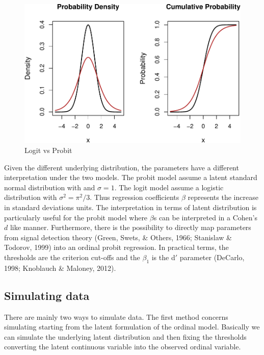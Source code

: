 \documentclass[
  man,floatsintext]{apa6}
\begin{document}
\begin{figure}

{\centering \includegraphics{paper-new_files/figure-latex/logit-vs-probit-1} 

}

\caption{Logit vs Probit}\label{fig:logit-vs-probit}
\end{figure}

Given the different underlying distribution, the parameters have a different interpretation under the two models. The probit model assume a latent standard normal distribution with and \(\sigma = 1\). The logit model assume a logistic distribution with \(\sigma^2 = \pi^2/3\). Thus regression coefficients \(\beta\) represents the increase in standard deviations units. The interpretation in terms of latent distribution is particularly useful for the probit model where \(\beta\)s can be interpreted in a Cohen's \(d\) like manner. Furthermore, there is the possibility to directly map parameters from signal detection theory (Green, Swets, \& Others, 1966; Stanislaw \& Todorov, 1999) into an ordinal probit regression. In practical terms, the thresholds are the criterion cut-offs and the \(\beta_1\) is the d\('\) parameter (DeCarlo, 1998; Knoblauch \& Maloney, 2012).

\subsection{Simulating data}\label{simulating-data}

There are mainly two ways to simulate data. The first method concerns simulating starting from the latent formulation of the ordinal model. Basically we can simulate the underlying latent distribution and then fixing the thresholds converting the latent continuous variable into the observed ordinal variable.
\end{document}
